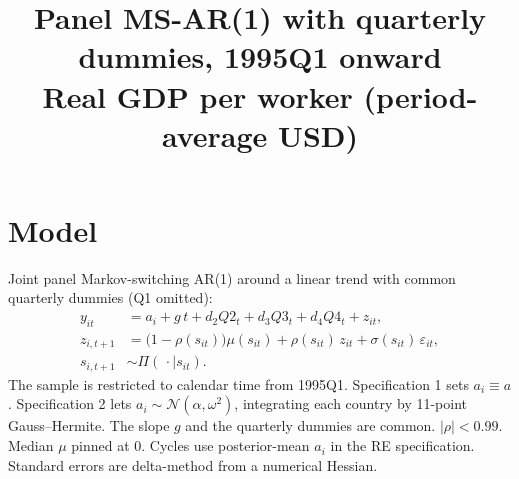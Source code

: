 \documentclass[11pt]{article}
\title{Panel MS-AR(1) with quarterly dummies, 1995Q1 onward\\[0.4em]\large Real GDP per worker (period-average USD)}
\author{}
\date{}
\begin{document}
\maketitle
\section{Model}
Joint panel Markov-switching AR(1) around a linear trend with common quarterly dummies (Q1 omitted):
\begin{align}
y_{it} &= a_i + g\, t + d_2 Q2_t + d_3 Q3_t + d_4 Q4_t + z_{it}, \\
z_{i,t+1} &= \bigl(1-\rho(s_{it})\bigr)\mu(s_{it}) + \rho(s_{it})\, z_{it} + \sigma(s_{it})\,\varepsilon_{it}, \\
s_{i,t+1} &\sim \Pi(\,\cdot\mid s_{it}).
\end{align}
The sample is restricted to calendar time from 1995Q1. Specification 1 sets $a_i\equiv a$. Specification 2 lets $a_i\sim\mathcal{N}(\alpha,\omega^2)$, integrating each country by 11-point Gauss--Hermite. The slope $g$ and the quarterly dummies are common. $|\rho|<0.99$. Median $\mu$ pinned at 0. Cycles use posterior-mean $a_i$ in the RE specification. Standard errors are delta-method from a numerical Hessian.
\clearpage
\end{document}
